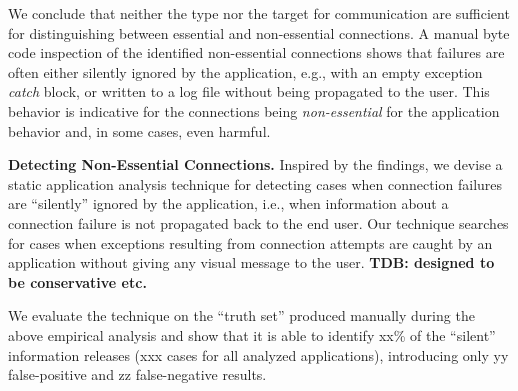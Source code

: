 We conclude that neither the type nor the target for communication are sufficient for distinguishing between essential and non-essential connections.
A manual byte code inspection of the identified non-essential connections shows that failures are often either silently ignored by the application, e.g., with an empty exception \emph{catch} block, or written to a log file without being propagated to the user. 
This behavior is indicative for the connections being \emph{non-essential} for the application behavior and, in some cases, even harmful. 
%
 




\vspace{0.1in}
\noindent 
{\bf Detecting Non-Essential Connections.}
Inspired by the findings, we devise a static application analysis technique for detecting cases when connection failures are
``silently''  ignored by the application, i.e., when information about a connection failure is not propagated back to the end user.
Our technique searches for cases when exceptions resulting from connection attempts are caught by an application without giving any visual message to the user. 
{\bf TDB: designed to be conservative etc.}

We evaluate the technique on the ``truth set'' produced manually during the above empirical analysis and show that it is able to identify xx\% of the ``silent'' information releases (xxx cases for all analyzed applications), introducing only yy false-positive and zz false-negative results. 

